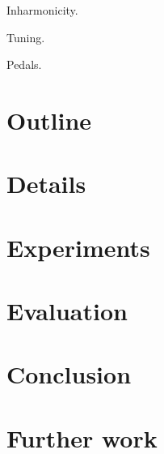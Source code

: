 \documentclass[11pt]{article} %
\begin{document}
Inharmonicity.

Tuning.

Pedals.

\section{Outline}

\section{Details}

\section{Experiments}

\section{Evaluation}

\section{Conclusion}

\section{Further work}




\newpage

\end{document}
